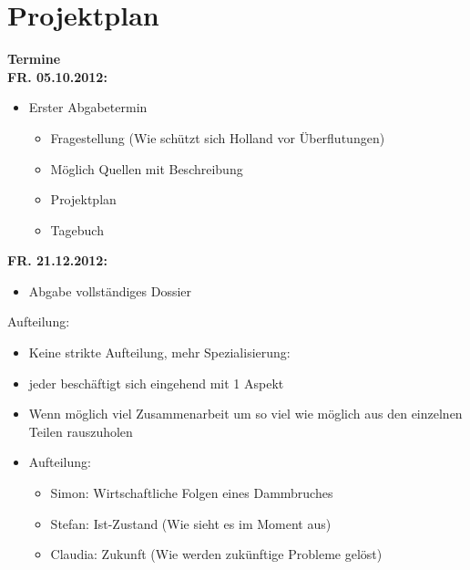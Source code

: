 \part{Projektplan}
\textbf{\large{Termine}}
\\[0.5cm]
\textbf{FR. 05.10.2012:}
\begin{itemize}
	\item Erster Abgabetermin
	\begin{itemize}
	  \item Fragestellung (Wie schützt sich Holland vor Überflutungen)
	  \item Möglich Quellen mit Beschreibung
	  \item Projektplan
	  \item Tagebuch 
	\end{itemize}
\end{itemize}
\textbf{FR. 21.12.2012:} 
\begin{itemize}
	\item Abgabe vollständiges Dossier
\end{itemize}
Aufteilung:
\begin{itemize}
	\item Keine strikte Aufteilung, mehr Spezialisierung:
	\item jeder beschäftigt sich eingehend mit 1 Aspekt
	\item Wenn möglich viel Zusammenarbeit um so viel wie möglich aus den einzelnen Teilen rauszuholen
	\item Aufteilung:
	\begin{itemize}
		\item Simon:	Wirtschaftliche Folgen eines Dammbruches
		\item Stefan:	Ist-Zustand (Wie sieht es im Moment aus)
		\item Claudia:	Zukunft (Wie werden zukünftige Probleme gelöst)
	\end{itemize}
\end{itemize}

